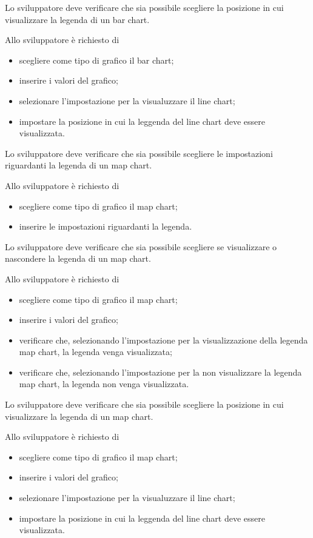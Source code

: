 	Lo sviluppatore deve verificare che sia possibile scegliere la posizione in cui visualizzare la legenda di un bar chart.
			
		Allo sviluppatore è richiesto di
		\begin{itemize}
			\item scegliere come tipo di grafico il bar chart;
			\item inserire i valori del grafico;
			\item selezionare l'impostazione per la visualuzzare il line chart;
			\item impostare la posizione in cui la leggenda del line chart deve essere visualizzata.
		\end{itemize}

	Lo sviluppatore deve verificare che sia possibile scegliere le impostazioni riguardanti la legenda di un map chart.

		Allo sviluppatore è richiesto di
		\begin{itemize}
			\item scegliere come tipo di grafico il map chart;
			\item inserire le impostazioni riguardanti la legenda.
		\end{itemize}

	Lo sviluppatore deve verificare che sia possibile scegliere se visualizzare o nascondere la legenda di un map chart.
			
		Allo sviluppatore è richiesto di
		\begin{itemize}
			\item scegliere come tipo di grafico il map chart;
			\item inserire i valori del grafico;
			\item verificare che, selezionando l'impostazione per la visualizzazione della legenda map chart, la legenda venga visualizzata;
			\item verificare che, selezionando l'impostazione per la non visualizzare la legenda map chart, la legenda non venga visualizzata.
		\end{itemize}

	Lo sviluppatore deve verificare che sia possibile scegliere la posizione in cui visualizzare la legenda di un map chart.
			
		Allo sviluppatore è richiesto di
		\begin{itemize}
			\item scegliere come tipo di grafico il map chart;
			\item inserire i valori del grafico;
			\item selezionare l'impostazione per la visualuzzare il line chart;
			\item impostare la posizione in cui la leggenda del line chart deve essere visualizzata.
		\end{itemize}

